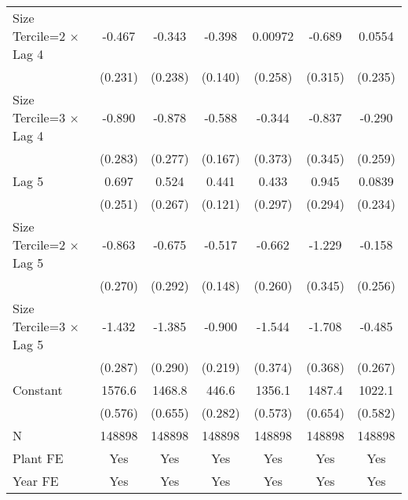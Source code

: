 \begin{table}[htbp]
\begin{tabular}{l*{6}{c}}
\addlinespace
Size Tercile=2 $\times$ Lag 4&   -0.467\sym{*}  &   -0.343         &   -0.398\sym{**} &  0.00972         &   -0.689\sym{*}  &   0.0554         \\
                &  (0.231)         &  (0.238)         &  (0.140)         &  (0.258)         &  (0.315)         &  (0.235)         \\
\addlinespace
Size Tercile=3 $\times$ Lag 4&   -0.890\sym{**} &   -0.878\sym{**} &   -0.588\sym{***}&   -0.344         &   -0.837\sym{*}  &   -0.290         \\
                &  (0.283)         &  (0.277)         &  (0.167)         &  (0.373)         &  (0.345)         &  (0.259)         \\
\addlinespace
Lag 5           &    0.697\sym{**} &    0.524\sym{*}  &    0.441\sym{***}&    0.433         &    0.945\sym{**} &   0.0839         \\
                &  (0.251)         &  (0.267)         &  (0.121)         &  (0.297)         &  (0.294)         &  (0.234)         \\
\addlinespace
Size Tercile=2 $\times$ Lag 5&   -0.863\sym{**} &   -0.675\sym{*}  &   -0.517\sym{***}&   -0.662\sym{*}  &   -1.229\sym{***}&   -0.158         \\
                &  (0.270)         &  (0.292)         &  (0.148)         &  (0.260)         &  (0.345)         &  (0.256)         \\
\addlinespace
Size Tercile=3 $\times$ Lag 5&   -1.432\sym{***}&   -1.385\sym{***}&   -0.900\sym{***}&   -1.544\sym{***}&   -1.708\sym{***}&   -0.485         \\
                &  (0.287)         &  (0.290)         &  (0.219)         &  (0.374)         &  (0.368)         &  (0.267)         \\
\addlinespace
Constant        &   1576.6\sym{***}&   1468.8\sym{***}&    446.6\sym{***}&   1356.1\sym{***}&   1487.4\sym{***}&   1022.1\sym{***}\\
                &  (0.576)         &  (0.655)         &  (0.282)         &  (0.573)         &  (0.654)         &  (0.582)         \\
\midrule
N               &   148898         &   148898         &   148898         &   148898         &   148898         &   148898         \\
Plant FE        &      Yes         &      Yes         &      Yes         &      Yes         &      Yes         &      Yes         \\
Year FE         &      Yes         &      Yes         &      Yes         &      Yes         &      Yes         &      Yes         \\

\end{tabular}
\end{table}
